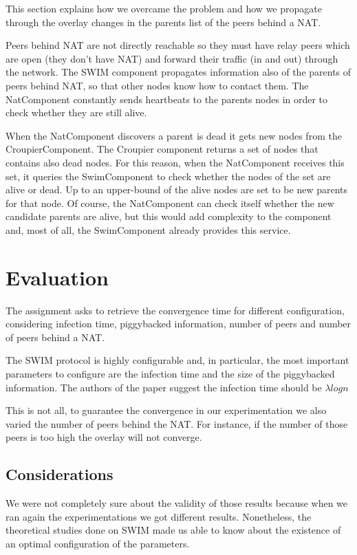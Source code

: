 \documentclass[10pt,a4paper]{proc}
\begin{document}
This section explains how we overcame the problem and how we propagate through the overlay changes in the parents list of the peers behind a NAT.

Peers behind NAT are not directly reachable so they must have relay peers which are open (they don't have NAT) and forward their traffic (in and out) through the network. The SWIM component propagates information also of the parents of peers behind NAT, so that other nodes know how to contact them. The NatComponent constantly sends heartbeats to the parents nodes in order to check whether they are still alive.

When the NatComponent discovers a parent is dead it gets new nodes from the CroupierComponent. The Croupier component returns a set of nodes that contains also dead nodes. For this reason, when the NatComponent receives this set, it queries the SwimComponent to check whether the nodes of the set are alive or dead. Up to an upper-bound of the alive nodes are set to be new parents for that node. Of course, the NatComponent can check itself whether the new candidate parents are alive, but this would add complexity to the component and, most of all, the SwimComponent already provides this service.

\section{Evaluation}

The assignment asks to retrieve the convergence time for different configuration, considering infection time, piggybacked information, number of peers and number of peers behind a NAT.

The SWIM protocol is highly configurable and, in particular, the most important parameters to configure are the infection time and the size of the piggybacked information. The authors of the paper suggest the infection time should be $\lambda logn$

This is not all, to guarantee the convergence in our experimentation we also varied the number of peers behind the NAT. For instance, if the number of those peers is too high the overlay will not converge.

\subsection{Considerations}

We were not completely sure about the validity of those results because when we ran again the experimentations we got different results. Nonetheless, the theoretical studies done on SWIM made us able to know about the existence of an optimal configuration of the parameters. 
\end{document}

